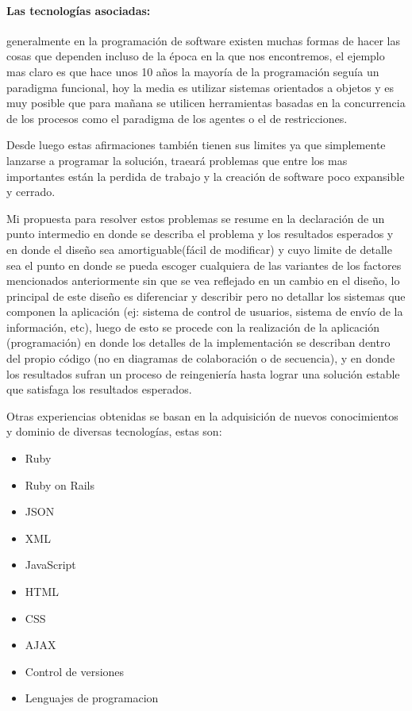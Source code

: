\paragraph{Las tecnologías asociadas:}
generalmente en la programación de software existen muchas formas de hacer las cosas que dependen incluso de la época en la que nos encontremos, el ejemplo mas claro es que hace unos 10 años la mayoría de la programación seguía un paradigma funcional, hoy la media es utilizar sistemas orientados a objetos y es muy posible que para mañana se utilicen herramientas basadas en la concurrencia de los procesos como el paradigma de los agentes o el de restricciones.


Desde luego estas afirmaciones también tienen sus limites ya que simplemente lanzarse a programar la solución, traeará problemas que entre los mas importantes están la perdida de trabajo y la creación de software poco expansible y cerrado.

Mi propuesta para resolver estos problemas se resume en la declaración de un punto intermedio en donde se describa el problema y los resultados esperados y en donde el diseño sea amortiguable(fácil de modificar) y cuyo limite de detalle sea el punto en donde se pueda escoger cualquiera de las variantes de los factores mencionados anteriormente sin que se vea reflejado en un cambio en el diseño, lo principal de este diseño es diferenciar y describir pero no detallar los sistemas que componen la aplicación (ej: sistema de control de usuarios, sistema de envío de la información, etc), luego de esto se procede con la realización de la aplicación (programación) en donde los detalles de la implementación se describan dentro del propio código (no en diagramas de colaboración o de secuencia), y en donde los resultados sufran un proceso de reingeniería hasta lograr una solución estable que satisfaga los resultados esperados.

Otras experiencias obtenidas se basan en la adquisición de nuevos conocimientos y dominio de diversas tecnologías, estas son:

\begin{itemize}
	\item Ruby
	\item Ruby on Rails
	\item JSON
	\item XML
	\item JavaScript
	\item HTML
	\item CSS
	\item AJAX
	\item Control de versiones
	\item Lenguajes de programacion
\end{itemize}
